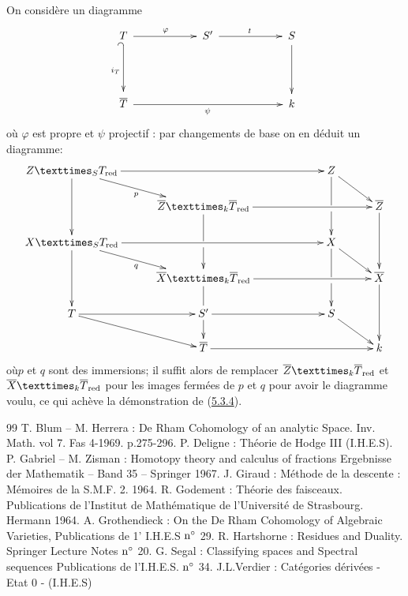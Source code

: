 \documentclass[10pt]{../fichiers-configuration-latex/smfart}
\begin{document}
On considère un diagramme
\[
\xymatrix@C=2cm@R=1.5cm@M=.2cm{
T \ar[r]^{\varphi} \ar@{_{(}->}[d]_{i_T}& S'\ar[r]^{t} & S\ar[d]\\
\bar{T} \ar[rr]_{\psi}&  & k\\
}
\]
où $\varphi$ est propre et $\psi$ projectif : par changements de base
on en déduit un diagramme:
\[
\xymatrix@C=1cm@R=.6cm{
\fprod{Z}{T_{\red}}{S} \ar[rrr] \ar[rd]_{p} \ar[dd]&&    & Z \ar[rd] \ar@{->} '[d][dd] &\\
         & \fprod{\bar{Z}}{\bar{T}_{\red}}{k} \ar[rrr] \ar@{->} '[d][dd]& &   & \bar{Z}\ar[dd]\\
\fprod{X}{T_{\red}}{S}  \ar[rrr] \ar[dd]\ar[rd]_{q} &  &    & X \ar[rd] \ar@{->} '[d][dd]&\\
         &\fprod{\bar{X}}{\bar{T}_{\red}}{k}  \ar@{->} '[d][dd] \ar[rrr]& &   & \bar{X} \ar[dd]\\
T \ar[rd]\ar[r]& S'\ar[rr]        &    & S \ar[rd] &\\
         & \bar{T}  \ar[rrr]&  &  & k
}
\]
où\pageoriginale $p$ et $q$ sont des immersions; il suffit alors
de remplacer $\fprod{\bar{Z}}{\bar{T}_{\red}}{k}$ et
$\fprod{\bar{X}}{\bar{T}_{\red}}{k}$ pour les images fermées de $p$
et $q$ pour avoir le diagramme voulu, ce qui achève la démonstration
de (\hyperref[Vbis.prop5.3.4]{5.3.4}).

\begin{thebibliography}{99}\pageoriginale
{} T. Blum -- M. Herrera : De Rham Cohomology of an
  analytic Space. Inv. Math. vol 7. Fas 4-1969. p.275-296.
 P. Deligne : Théorie de Hodge III (I.H.E.S).
 P. Gabriel -- M. Zisman : Homotopy theory and calculus of
  fractions Ergebnisse der Mathematik -- Band 35 -- Springer 1967.
 J. Giraud : Méthode de la descente : Mémoires de la
  S.M.F. 2. 1964.
 R. Godement : Théorie des faisceaux.
                                Publications de l'Institut de
                                Mathématique de l'Université de
                                Strasbourg. Hermann 1964.
 A. Grothendieck : On the De Rham Cohomology of Algebraic
  Varieties, Publications de 1' I.H.E.S ${\rm n^{\circ}}$ 29.
 R. Hartshorne : Residues and Duality. Springer
  Lecture Notes ${\rm n^{\circ}}$ 20.
 G. Segal : Classifying spaces and Spectral sequences
  Publications de l'I.H.E.S. ${\rm n^{\circ}}$ 34.
 J.L.Verdier : Catégories dérivées - Etat 0 -
  (I.H.E.S)
\end{thebibliography}

\ifx\danslelivre\undefined
\end{document}
